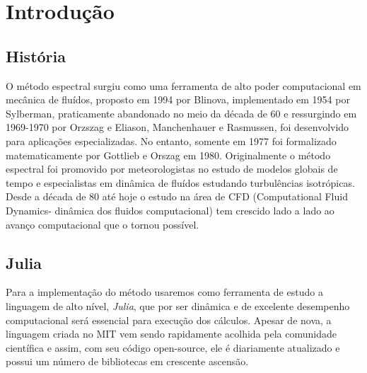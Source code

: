 \chapter{Introdução}
\label{cap:introducao}
\section{História}
O método espectral surgiu como uma ferramenta de alto poder computacional em mecânica de fluídos, proposto em 1994 por Blinova, implementado em 1954 por Sylberman, praticamente abandonado no meio da década de 60 e ressurgindo em 1969-1970 por Orzszag e Eliason, Manchenhauer e Rasmussen, foi desenvolvido para aplicações especializadas. No entanto, somente em 1977 foi formalizado matematicamente por Gottlieb e Orszag em 1980.
Originalmente o método espectral foi promovido por meteorologistas no estudo de modelos globais de tempo e especialistas em dinâmica de fluídos estudando turbulências isotrópicas. Desde a década de 80 até hoje o  estudo na área de CFD (Computational Fluid Dynamics- dinâmica dos fluidos computacional) tem crescido lado a lado ao avanço computacional que o tornou possível.
\section{Julia}
 Para a implementação do método usaremos como ferramenta de estudo a linguagem de alto nível, \emph{Julia}, que por ser dinâmica e de excelente desempenho  computacional será essencial para execução dos cálculos.
 Apesar de nova, a linguagem criada no MIT vem sendo rapidamente acolhida pela comunidade científica e assim, com seu código open-source, ele é diariamente atualizado e possui um número de  bibliotecas em crescente ascensão.


%
%
%




